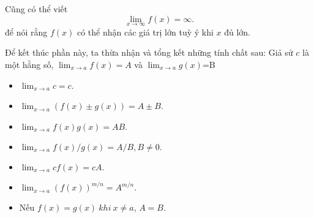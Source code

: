 Cũng có thể viết  $$\lim_{x\rightarrow\infty}f(x)=\infty.$$ để nói rằng $f(x)$ có thể nhận các giá trị lớn tuỳ ý khi $x$ đủ lớn.\newline    
\vspace{5pt}

Để kết thúc phần này, ta thừa nhận và tổng kết những tính chất sau: Giả sử $c$ là một hằng số, $\lim_{x\rightarrow a}f(x)=A$ và $\lim_{x\rightarrow a}g(x)$=B
\begin{multicols}{2}
    \begin{itemize}
        \item $\lim_{x\rightarrow a}c = c$.
        \item $\lim_{x\rightarrow a}(f(x)\pm g(x))=A \pm B $.
        \item $\lim_{x\rightarrow a}f(x)g(x)=AB.$
        \item $\lim_{x\rightarrow a}f(x)/g(x)=A/B, B\neq 0.$
        \item $\lim_{x\rightarrow a
        }cf(x)=cA.$
        \item  $\lim_{x\rightarrow a}(f(x))^{m/n}=A^{m/n}.$
        \item Nếu $f(x)=g(x)~khi~x\neq a$, $A=B$.
    \end{itemize}     
\end{multicols}
